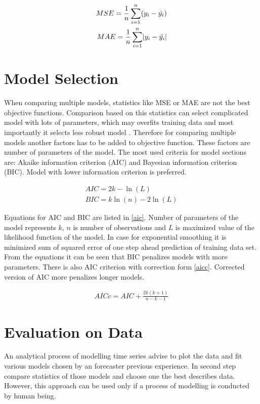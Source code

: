     \begin{subequations} \label{accuracy}
        \begin{align} \label{accuracy-mse}
             MSE = \frac{1}{n} \sum_{i=1}^{n}(y_i - \hat{y_i}) \\ \label{accuracy-mae}
             MAE = \frac{1}{n} \sum_{i=1}^{n} \abs{y_i - \hat{y_i}}
         \end{align}
    \end{subequations}

    \section{Model Selection} \label{model-selection}
    When comparing multiple models, statistics like MSE or MAE are not the best objective functions. Comparison
    based on this statistics can select complicated model with lots of parameters, which may overfits training data
    and most importantly it selects less robust model \cite{cipra}. Therefore for comparing multiple models another
    factors has to be added to objective function. These factors are number of parameters of the model. The
    most used criteria for model sections are: Akaike information criterion (AIC) and Bayesian information
    criterion (BIC). Model with lower information criterion is preferred.

    \begin{eqnarray} \label{aic}
        AIC = 2 k - \ln(L) \\ \nonumber
        BIC = k \ln(n) - 2 \ln(L)
    \end{eqnarray}

    Equations for AIC and BIC are listed in \ref{aic}. Number of parameters of the model represents $k$, $n$ is number
    of observations and $L$ is maximized value of the likelihood function of the model. In case for exponential
    smoothing it is minimized sum of squared error of one step ahead prediction of training data set. From the
    equations it can be seen that BIC penalizes models with more parameters. There is also AIC criterion with
    correction form \ref{aicc}. Corrected version of AIC more penalizes longer models.

    \begin{eqnarray} \label{aicc}
        AICc = AIC + \frac{2k(k+1)}{n-k-1}
    \end{eqnarray}

    \section{Evaluation on Data}
    An analytical process of modelling time series advise to plot the data and fit various models chosen by an
    forecaster previous experience. In second step compare statistics of those models and choose one the best describes
    data. However, this approach can be used only if a process of modelling is conducted by human being.

